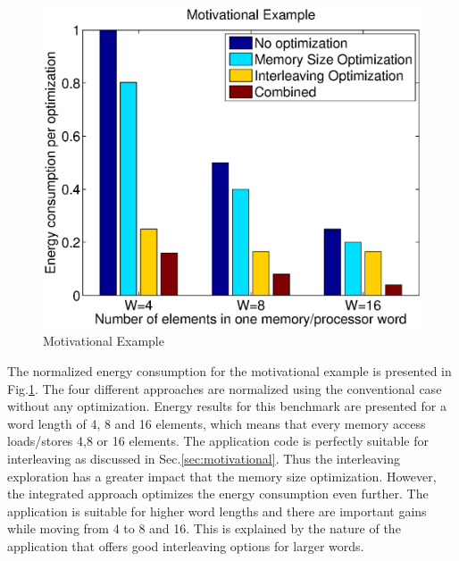 \documentclass[prodmode,acmtodaes]{acmsmall}
\begin{document}
\begin{figure}
\centering
	\caption{Motivational Example}
	\label{fig:example}
	\includegraphics[scale = 0.5]{Images/Example.eps} 
\end{figure}

The normalized energy consumption for the motivational example is presented in Fig.\ref{fig:example}.
The four different approaches are normalized using the conventional case without any optimization.
Energy results for this benchmark are presented for a word length of 4, 8 and 16 elements, which means that every memory access loads/stores 4,8 or 16 elements. 
The application code is perfectly suitable for interleaving as discussed in Sec.\ref{sec:motivational}.
Thus the interleaving exploration has a greater impact that the memory size optimization.
However, the integrated approach optimizes the energy consumption even further.
The application is suitable for higher word lengths and there are important gains while moving from 4 to 8 and 16.
This is explained by the nature of the application that offers good interleaving options for larger words.
\end{document}
